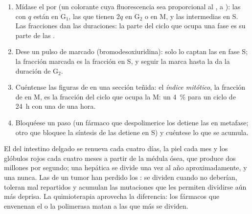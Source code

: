 \begin{method}\label{met:b1:replication-mitosis:reading}
\begin{enumerate}
  \item Mídase el  por  (un colorante cuya fluorescencia sea
        proporcional al ,  a ): las  con $q$ están en
        G$_1$, las que tienen $2q$ en G$_2$ o en M, y las intermedias en S.
        Las fracciones dan las duraciones: la parte del ciclo que ocupa una
        fase es su parte de las .
  \item Dese un pulso de  marcado (bromodesoxiuridina): solo lo
        captan las  en fase S; la fracción marcada es la fracción en
        S, y seguir la marca hasta la  da la duración de G$_2$.
  \item Cuéntense las figuras de  en una sección teñida: el
        \emph{índice mitótico}, la fracción de  en M, es la fracción
        del ciclo que ocupa la M: un \qty{4}{\%} para un ciclo de
        \qty{24}{h} con una  de una hora.
  \item Bloquéese un paso (un fármaco que despolimerice los 
        detiene las  en metafase; otro que bloquee la síntesis de
         las detiene en S) y cuéntese lo que se acumula.
\end{enumerate}
\end{method}

\begin{example}[Recambio]\label{ex:b1:replication-mitosis:turnover}
El  del intestino delgado se renueva cada cuatro días, la piel cada
mes y los glóbulos rojos cada cuatro meses a partir de la médula ósea, que
produce dos millones por segundo; una  hepática se divide una vez al
año aproximadamente, y una  nunca. Las  de un tumor han
perdido los : se dividen cuando no deberían, toleran
 mal repartidos y acumulan las mutaciones que les permiten
dividirse aún más deprisa. La quimioterapia aprovecha la diferencia: los
fármacos que envenenan el  o la polimerasa matan a las  que más
se dividen.
\end{example}

